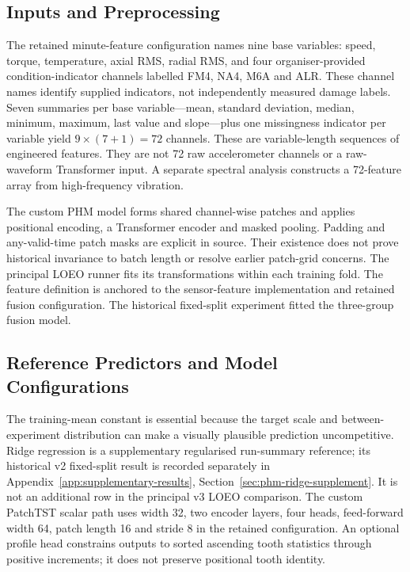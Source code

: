 \subsection{Inputs and Preprocessing}
The retained minute-feature configuration names nine base variables: speed, torque,
temperature, axial RMS, radial RMS, and four organiser-provided condition-indicator
channels labelled FM4, NA4, M6A and ALR. These channel names identify supplied
indicators, not independently measured damage labels. Seven summaries per base
variable---mean, standard deviation, median, minimum, maximum, last value and
slope---plus one missingness indicator per variable yield
$9\times(7+1)=72$ channels. These are variable-length
sequences of engineered features. They are not 72 raw accelerometer channels or a
raw-waveform Transformer input. A separate spectral analysis constructs a 72-feature
array from high-frequency vibration.

The custom PHM model forms shared channel-wise patches and applies positional encoding,
a Transformer encoder and masked pooling. Padding and any-valid-time patch masks are
explicit in source. Their existence does not prove historical invariance to batch length
or resolve earlier patch-grid concerns. The principal LOEO runner fits its transformations within each training fold.
The feature definition is anchored to the sensor-feature implementation and retained
fusion configuration. The historical fixed-split experiment fitted the three-group fusion model.
{}
{}

\subsection{Reference Predictors and Model Configurations}
The training-mean constant is essential because the target scale and between-experiment
distribution can make a visually plausible prediction uncompetitive. Ridge regression is a supplementary regularised run-summary reference; its historical
v2 fixed-split result is recorded separately in Appendix~\ref{app:supplementary-results}, Section~\ref{sec:phm-ridge-supplement}.
It is not an additional row in the principal v3 LOEO comparison. The custom PatchTST scalar path uses width 32,
two encoder layers, four heads, feed-forward width 64, patch length 16 and stride 8 in
the retained configuration. An optional profile head constrains outputs to sorted
ascending tooth statistics through positive increments; it does not preserve positional
tooth identity.

